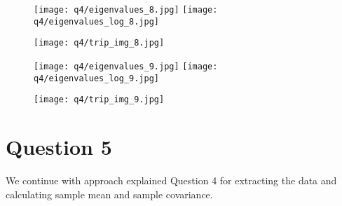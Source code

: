\documentclass[11pt, fleqn]{article}
\begin{document}
\newpage
\begin{figure}[H]
    \begin{floatrow}
        \ffigbox[0.45\textwidth]{}
        {\texttt{[image: q4/eigenvalues\_8.jpg]}}
        \ffigbox[0.45\textwidth]{}
        {\texttt{[image: q4/eigenvalues\_log\_8.jpg]}}
    \end{floatrow}
    \vspace{1em}
    \begin{floatrow}
        \ffigbox[0.9\textwidth]{}
        {\texttt{[image: q4/trip\_img\_8.jpg]}}
    \end{floatrow}
\end{figure}
\newpage
\begin{figure}[H]
    \begin{floatrow}
        \ffigbox[0.45\textwidth]{}
        {\texttt{[image: q4/eigenvalues\_9.jpg]}}
        \ffigbox[0.45\textwidth]{}
        {\texttt{[image: q4/eigenvalues\_log\_9.jpg]}}
    \end{floatrow}
    \vspace{1em}
    \begin{floatrow}
        \ffigbox[0.9\textwidth]{}
        {\texttt{[image: q4/trip\_img\_9.jpg]}}
    \end{floatrow}
\end{figure}

\newpage
\section*{Question 5}
\setcounter{equation}{0}
\setcounter{figure}{0}
We continue with approach explained Question 4 for extracting the data and calculating sample mean and sample covariance.
\end{document}
